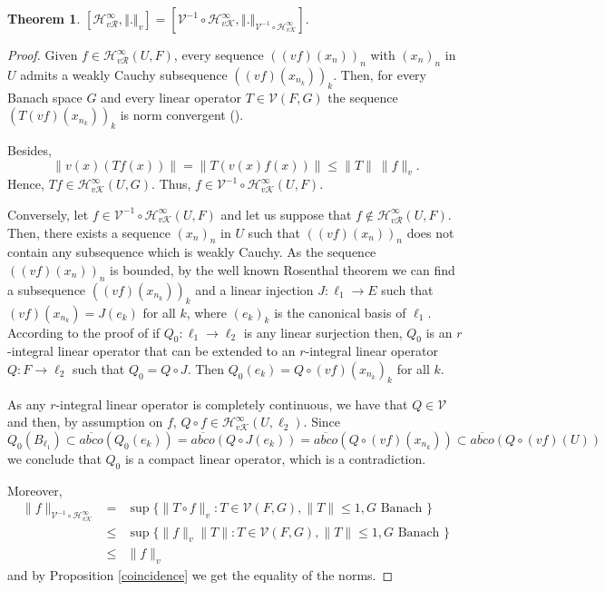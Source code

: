 \documentclass[12pt]{amsart}
\newtheorem{theorem}{Theorem}[section]
\theoremstyle{plain}
\numberwithin{equation}{section}
\begin{document}
\begin{theorem}
$\left[ \mathcal{H}_{v\mathcal{R}}^{\infty },\left\Vert .\right\Vert _{v}%
\right] =\left[ \mathcal{V}^{-1}\circ \mathcal{H}_{v\mathcal{K}}^{\infty
},\left\Vert .\right\Vert _{\mathcal{V}^{-1}\circ \mathcal{H}_{v\mathcal{K}%
}^{\infty }}\right] .$
\end{theorem}

\begin{proof}
Given $f\in \mathcal{H}_{v\mathcal R}^{\infty }(U,F)$,  every sequence $((vf)(x_n))_n$ with $(x_n)_n$ in $U$ admits a weakly Cauchy subsequence $((vf)(x_{n_k}))_k$. Then, for every Banach space $G$ and every linear operator $T\in\mathcal V(F,G)$ the sequence $(T(vf)(x_{n_k}))_k$ is norm convergent (\cite[Proposition 1.6.3]{Pietsch1980}). 

Besides, 
$$
\|v(x)(Tf(x))\|=\|T(v(x)f(x))\|\leq \|T\| \ \|f\|_v.
$$
Hence, $Tf\in \mathcal H_{v\mathcal K}^\infty(U,G)$. Thus, $f\in \mathcal V^{-1}\circ \mathcal H_{v\mathcal K}^\infty(U,F)$.

Conversely, let $f\in \mathcal V^{-1} \circ \mathcal H_{v\mathcal K}^\infty(U,F)$ and let us suppose that $f\notin \mathcal{H}_{v\mathcal R}^{\infty }(U,F)$. Then, there exists a sequence $(x_n)_n$ in $U$ such that $((vf)(x_n))_n$ does not contain any subsequence which is weakly Cauchy. As the sequence $((vf)(x_n))_n$ is bounded, by the well known Rosenthal theorem we can find a subsequence $((vf)(x_{n_k}))_k$ and a linear  injection $J:\ell_1\to E$ such that $(vf)(x_{n_k})=J(e_k)$ for all $k$, where $(e_k)_k$  is the canonical basis of $\ell_1$. According to the proof of \cite[Theorem 28.5.8]{Pietsch1980} if $Q_0:\ell_1\to \ell_2$ is any linear surjection then, $Q_0$ is an $r$-integral linear operator that can be extended to an $r$-integral linear operator $Q:F\to\ell_2$ such that $Q_0=Q\circ J$. Then $Q_0(e_k)=Q\circ (vf)(x_{n_k})_k$ for all $k$.

As any $r$-integral linear operator is completely continuous, we have that $Q\in \mathcal V$ and then, by assumption on $f$,  $Q\circ f\in \mathcal H_{v\mathcal K}^\infty(U,\ell_2)$. Since
$$
Q_0(B_{\ell_1})\subset \overline{abco}(Q_0(e_k))=\overline{abco}(Q\circ J(e_k))=\overline{abco}(Q\circ(vf)(x_{n_k}))\subset \overline{abco}(Q\circ(vf)(U))
$$
we conclude that $Q_0$ is a compact linear operator, which is a contradiction.

Moreover, 
\begin{eqnarray*}
\|f\|_{\mathcal V^{-1}\circ \mathcal H_{v\mathcal K}^\infty}&=& \sup\{\|T\circ f\|_v:T\in \mathcal V(F,G), \|T\|\leq 1, G \mbox{ Banach }\}\\
&\leq & \sup\{\|f\|_v\|T\|: T\in \mathcal V(F,G), \|T\|\leq 1, G \mbox{ Banach }\}\\
&\leq & \|f\|_v
\end{eqnarray*}
and by Proposition \ref{coincidence} we get the equality of the norms.

\end{proof}
\end{document}
